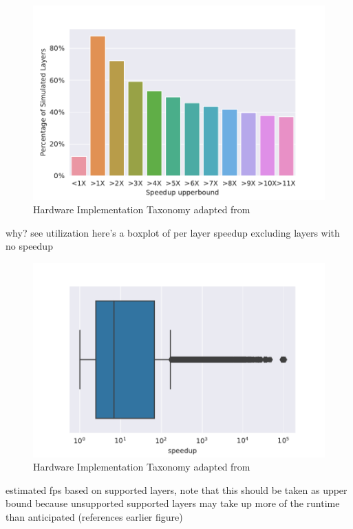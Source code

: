 \begin{figure}[ht]
    \centering
    \includegraphics[scale=0.58]{Plots/latency/layer_speedup.pdf}
    \caption{Hardware Implementation Taxonomy adapted from \cite{maestro}}
    \label{fig:hw_taxonomy}
\end{figure}


why? see utilization
here's a boxplot of per layer speedup excluding layers with no speedup

\begin{figure}[ht]
    \centering
    \includegraphics[scale=0.58]{Plots/latency/speedup_gt_1_boxplot.pdf}
    \caption{Hardware Implementation Taxonomy adapted from \cite{maestro}}
    \label{fig:hw_taxonomy}
\end{figure}

estimated fps based on supported layers, note that this should be taken as upper
bound because unsupported supported layers may take up more of the runtime than
anticipated (references earlier figure)

